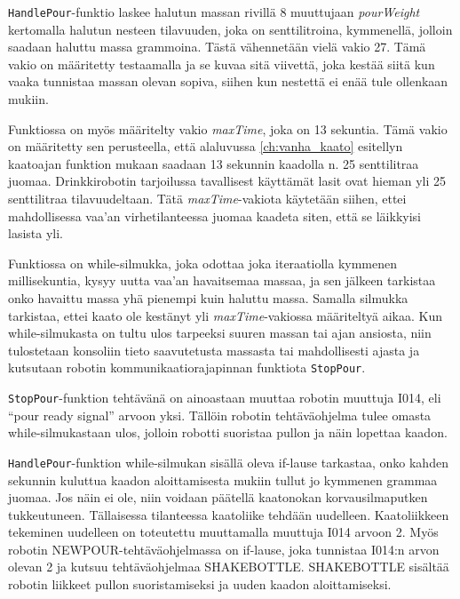 \newpage

\texttt{HandlePour}\hyp{}funktio laskee halutun massan rivillä 8 muuttujaan \textit{pourWeight} kertomalla halutun nesteen tilavuuden, joka on senttilitroina, kymmenellä, jolloin saadaan haluttu massa grammoina. Tästä vähennetään vielä vakio 27. Tämä vakio on määritetty testaamalla ja se kuvaa sitä viivettä, joka kestää siitä kun vaaka tunnistaa massan olevan sopiva, siihen kun nestettä ei enää tule ollenkaan mukiin.

Funktiossa on myös määritelty vakio \textit{maxTime}, joka on 13 sekuntia. Tämä vakio on määritetty sen perusteella, että alaluvussa \ref{ch:vanha_kaato} esitellyn kaatoajan funktion mukaan saadaan 13 sekunnin kaadolla n. 25 senttilitraa juomaa. Drinkkirobotin tarjoilussa tavallisest käyttämät lasit ovat hieman yli 25 senttilitraa tilavuudeltaan. Tätä \textit{maxTime}-vakiota käytetään siihen, ettei mahdollisessa vaa'an virhetilanteessa juomaa kaadeta siten, että se läikkyisi lasista yli.

Funktiossa on while-silmukka, joka odottaa joka iteraatiolla kymmenen millisekuntia, kysyy uutta vaa'an havaitsemaa massaa, ja sen jälkeen tarkistaa onko havaittu massa yhä pienempi kuin haluttu massa. Samalla silmukka tarkistaa, ettei kaato ole kestänyt yli \textit{maxTime}-vakiossa määriteltyä aikaa. Kun while-silmukasta on tultu ulos tarpeeksi suuren massan tai ajan ansiosta, niin tulostetaan konsoliin tieto saavutetusta massasta tai mahdollisesti ajasta ja kutsutaan robotin kommunikaatiorajapinnan funktiota \texttt{StopPour}.

\texttt{StopPour}-funktion tehtävänä on ainoastaan muuttaa robotin muuttuja I014, eli ``pour ready signal'' arvoon yksi. Tällöin robotin tehtäväohjelma tulee omasta while-silmukastaan ulos, jolloin robotti suoristaa pullon ja näin lopettaa kaadon.

\texttt{HandlePour}-funktion while-silmukan sisällä oleva if-lause tarkastaa, onko kahden sekunnin kuluttua kaadon aloittamisesta mukiin tullut jo kymmenen grammaa juomaa. Jos näin ei ole, niin voidaan päätellä kaatonokan korvausilmaputken tukkeutuneen. Tällaisessa tilanteessa kaatoliike tehdään uudelleen. Kaatoliikkeen tekeminen uudelleen on toteutettu muuttamalla muuttuja I014 arvoon 2. Myös robotin NEWPOUR-tehtäväohjelmassa on if-lause, joka tunnistaa I014:n arvon olevan 2 ja kutsuu tehtäväohjelmaa SHAKEBOTTLE. SHAKEBOTTLE sisältää robotin liikkeet pullon suoristamiseksi ja uuden kaadon aloittamiseksi.

\newpage

